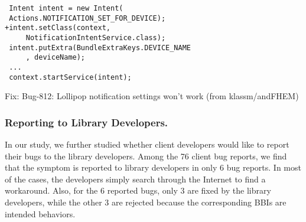 \begin{example}
	\begin{verbatim}
 Intent intent = new Intent(
 Actions.NOTIFICATION_SET_FOR_DEVICE); 
+intent.setClass(context, 
     NotificationIntentService.class);
 intent.putExtra(BundleExtraKeys.DEVICE_NAME
     , deviceName);          
 ...
 context.startService(intent); 
	\end{verbatim}
	\caption{Fix: Bug-812: Lollipop notification settings won't work \small{(from klassm/andFHEM)}} 
	\label{example:fix}
\end{example}

		

\subsubsection{Reporting to Library Developers. } In our study, we further studied whether client developers would like to report their bugs to the library developers. Among the 76 client bug reports, we find that the symptom is reported to library developers in only 6 bug reports. In most of the cases, the developers simply search through the Internet to find a workaround. Also, for the 6 reported bugs, only 3 are fixed by the library developers, while the other 3 are rejected because the corresponding BBIs are intended behaviors. 

